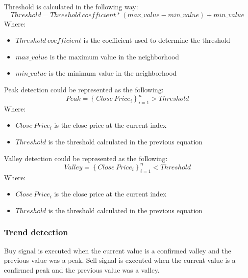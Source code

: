 \documentclass{imc-inf}
\begin{document}
			Threshold is calculated in the following way:
			\begin{equation}
				Threshold = Threshold\ coefficient * (max\_value - min\_value) + min\_value 
			\end{equation}
			Where:
			\begin{itemize}
				\item $Threshold\ coefficient$ is the coefficient used to determine the threshold
				\item $max\_value$ is the maximum value in the neighborhood
				\item $min\_value$ is the minimum value in the neighborhood
			\end{itemize}
			Peak detection could be represented as the following:
			\begin{equation}
				Peak = \left\{Close\ Price_{i}\right\}_{i=1}^{n} > Threshold
			\end{equation}
			Where:
			\begin{itemize}
				\item $Close\ Price_{i}$ is the close price at the current index
				\item $Threshold$ is the threshold calculated in the previous equation
			\end{itemize}
			Valley detection could be represented as the following:
			\begin{equation}
				Valley = \left\{Close\ Price_{i}\right\}_{i=1}^{n} < Threshold
			\end{equation}
			Where:
			\begin{itemize}
				\item $Close\ Price_{i}$ is the close price at the current index
				\item $Threshold$ is the threshold calculated in the previous equation
			\end{itemize}
			\subsubsection{Trend detection}
				Buy signal is executed when the current value is a confirmed valley and the previous value was a peak.
				Sell signal is executed when the current value is a confirmed peak and the previous value was a valley.
		
\end{document}
